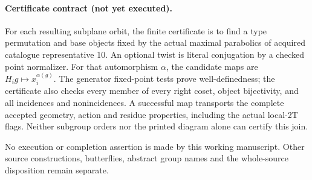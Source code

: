 \documentclass[11pt]{article}
\begin{document}
\paragraph{Certificate contract (not yet executed).}
For each resulting subplane orbit, the finite certificate is to find a
type permutation and base objects fixed by the actual maximal parabolics
of acquired catalogue representative 10. An optional twist is literal
conjugation by a checked point normalizer. For that automorphism $\alpha$,
the candidate maps are $H_i g\mapsto x_i^{\alpha(g)}$.
The generator fixed-point tests prove well-definedness; the certificate
also checks every member of every right coset, object bijectivity, and
all incidences and nonincidences. A successful map transports the complete
accepted geometry, action and residue properties, including the actual
local-2T flags. Neither subgroup orders nor the printed diagram alone
can certify this join.

No execution or completion assertion is made by this working manuscript.
Other source constructions, butterflies, abstract group names and the
whole-source disposition remain separate.
\end{document}
